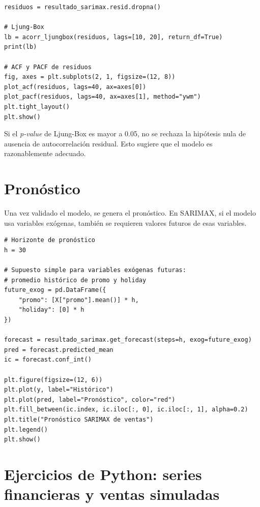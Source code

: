\documentclass[12pt,a4paper]{article}
\begin{document}
\begin{lstlisting}[style=pythonstyle]
residuos = resultado_sarimax.resid.dropna()

# Ljung-Box
lb = acorr_ljungbox(residuos, lags=[10, 20], return_df=True)
print(lb)

# ACF y PACF de residuos
fig, axes = plt.subplots(2, 1, figsize=(12, 8))
plot_acf(residuos, lags=40, ax=axes[0])
plot_pacf(residuos, lags=40, ax=axes[1], method="ywm")
plt.tight_layout()
plt.show()
\end{lstlisting}

\begin{interpretacion}
Si el \textit{p-value} de Ljung-Box es mayor a 0.05, no se rechaza la hipótesis nula de ausencia de autocorrelación residual. Esto sugiere que el modelo es razonablemente adecuado.
\end{interpretacion}

\section{Pronóstico}

\begin{markdowncell}
Una vez validado el modelo, se genera el pronóstico. En SARIMAX, si el modelo usa variables exógenas, también se requieren valores futuros de esas variables.
\end{markdowncell}

\begin{lstlisting}[style=pythonstyle]
# Horizonte de pronóstico
h = 30

# Supuesto simple para variables exógenas futuras:
# promedio histórico de promo y holiday
future_exog = pd.DataFrame({
    "promo": [X["promo"].mean()] * h,
    "holiday": [0] * h
})

forecast = resultado_sarimax.get_forecast(steps=h, exog=future_exog)
pred = forecast.predicted_mean
ic = forecast.conf_int()

plt.figure(figsize=(12, 6))
plt.plot(y, label="Histórico")
plt.plot(pred, label="Pronóstico", color="red")
plt.fill_between(ic.index, ic.iloc[:, 0], ic.iloc[:, 1], alpha=0.2)
plt.title("Pronóstico SARIMAX de ventas")
plt.legend()
plt.show()
\end{lstlisting}

\section{Ejercicios de Python: series financieras y ventas simuladas}
\end{document}
